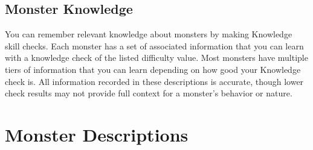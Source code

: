     \subsection{Monster Knowledge}
        You can remember relevant knowledge about monsters by making Knowledge skill checks.
        Each monster has a set of associated information that you can learn with a knowledge check of the listed difficulty value.
        Most monsters have multiple tiers of information that you can learn depending on how good your Knowledge check is.
        All information recorded in these descriptions is accurate, though lower check results may not provide full context for a monster's behavior or nature.

\section{Monster Descriptions}


